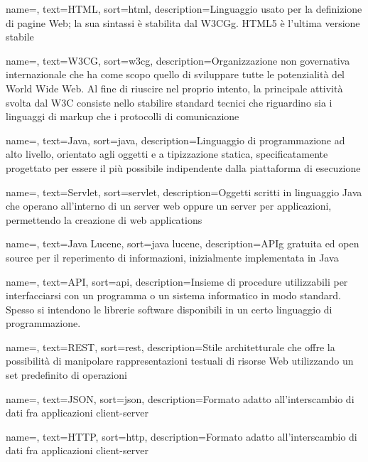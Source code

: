 {
	name=,
	text=HTML,
	sort=html,
	description={Linguaggio usato per la definizione di pagine Web; la sua sintassi è stabilita dal \gls{W3CGg}. HTML5 è l’ultima versione stabile}
}

{
	name=,
	text=W3CG,
	sort=w3cg,
	description={Organizzazione non governativa internazionale che ha come scopo quello di sviluppare tutte le potenzialità del World Wide Web. Al fine di riuscire nel proprio intento, la principale attività svolta dal W3C consiste nello stabilire standard tecnici che riguardino sia i linguaggi di markup che i protocolli di comunicazione}
}

{
	name=,
	text=Java,
	sort=java,
	description={Linguaggio di programmazione ad alto livello, orientato agli oggetti e a tipizzazione statica, specificatamente progettato per essere il più possibile indipendente dalla piattaforma di esecuzione}
}

{
	name=,
	text=Servlet,
	sort=servlet,
	description={Oggetti scritti in linguaggio \gls{Java} che operano all'interno di un server web oppure un server per applicazioni, permettendo la creazione di web applications}
}

{
	name=,
	text=Java Lucene,
	sort=java lucene,
	description={\gls{APIg} gratuita ed \gls{open source} per il reperimento di informazioni, inizialmente implementata in \gls{Java}}
}

{
	name=,
	text=API,
	sort=api,
	description={Insieme di procedure utilizzabili per interfacciarsi con un programma o un sistema informatico in modo standard. Spesso si intendono le librerie software disponibili in un certo linguaggio di programmazione.
	}
}

{
	name=,
	text=REST,
	sort=rest,
	description={Stile architetturale che offre la possibilità di manipolare rappresentazioni testuali di risorse Web utilizzando un set predefinito di operazioni}
}

{
	name=,
	text=JSON,
	sort=json,
	description={Formato adatto all'interscambio di dati fra applicazioni client-server}
}

{
	name=,
	text=HTTP,
	sort=http,
	description={Formato adatto all'interscambio di dati fra applicazioni client-server}
}

